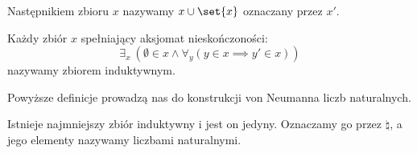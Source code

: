 \begin{definition}[Następnik]
    Następnikiem zbioru \( x \) nazywamy \( x \cup \set{x} \) oznaczany przez \( x' \).
\end{definition}

\begin{definition}
    Każdy zbiór \( x \) spełniający aksjomat nieskończoności:
    \[
        \exists_x \ (\emptyset \in x \land \forall_y (y \in x \implies y' \in x))
    \]
    nazywamy zbiorem induktywnym.
\end{definition}

Powyższe definicje prowadzą nas do konstrukcji von Neumanna liczb naturalnych.
\begin{definition}
    Istnieje najmniejszy zbiór induktywny i jest on jedyny. Oznaczamy go przez \( \natural \), a jego elementy nazywamy liczbami naturalnymi.
\end{definition}

